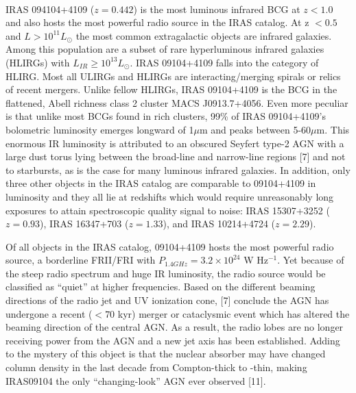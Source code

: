 \documentclass[letterpaper,11pt,twocolumn]{article}
\begin{document}
\\
IRAS 094104+4109 ($z=0.442$) is the most luminous infrared BCG at $z<1.0$ and also
hosts the most powerful radio source in the IRAS catalog. At z $< 0.5$
and $L > 10^{11} L_{\odot}$ the most common extragalactic objects are
infrared galaxies. Among this population are a subset of rare
hyperluminous infrared galaxies (HLIRGs) with $L_{IR} \geq 10^{13}
L_{\odot}$. IRAS 09104+4109 falls into the category of HLIRG. Most all
ULIRGs and HLIRGs are interacting/merging spirals or relics of recent
mergers. Unlike fellow HLIRGs, IRAS 09104+4109 is the BCG in the
flattened, Abell richness class 2 cluster MACS J0913.7+4056. Even more
peculiar is that unlike most BCGs found in rich clusters, 99\% of
IRAS 09104+4109's bolometric luminosity emerges longward of 1$\mu$m
and peaks between 5-60$\mu$m. This enormous IR luminosity is
attributed to an obscured Seyfert type-2 AGN with a large dust torus
lying between the broad-line and narrow-line regions
[7] and not to starbursts, as is the case for
many luminous infrared galaxies. In addition, only three other objects
in the IRAS catalog are comparable to 09104+4109 in luminosity and
they all lie at redshifts which would require unreasonably long
exposures to attain spectroscopic quality signal to noise: IRAS
15307+3252 ($z=0.93$), IRAS 16347+703 ($z=1.33$), and IRAS 10214+4724
($z=2.29$).

Of all objects in the IRAS catalog, 09104+4109 hosts the most powerful
radio source, a borderline FRII/FRI with $P_{1.4GHz} =
3.2\times10^{24}$ W Hz$^{-1}$. Yet because of the steep radio spectrum
and huge IR luminosity, the radio source would be classified as
``quiet'' at higher frequencies. Based on the different beaming
directions of the radio jet and UV ionization cone,
[7] conclude the AGN has undergone a recent ($<
70$ kyr) merger or cataclysmic event which has altered the beaming
direction of the central AGN. As a result, the radio lobes are no
longer receiving power from the AGN and a new jet axis has been
established. Adding to the mystery of this object is that the nuclear
absorber may have changed column density in the last decade from
Compton-thick to -thin, making IRAS09104 the only ``changing-look''
AGN ever observed [11].\\
\end{document}
